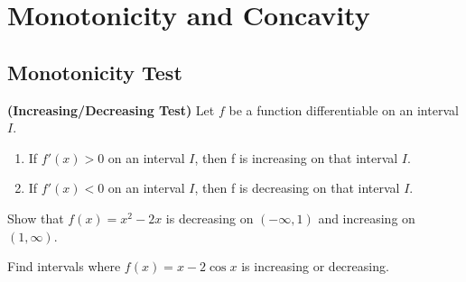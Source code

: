 
\hypertarget{monotonicity-and-concavity}{%
\section{Monotonicity and Concavity}\label{monotonicity-and-concavity}}

\hypertarget{monotonicity-test}{%
\subsection{Monotonicity Test}\label{monotonicity-test}}

\begin{proposition}

\textbf{(Increasing/Decreasing Test)} Let \(f\) be a function
differentiable on an interval \(I\).

\begin{enumerate}[sepno]
\item
  If \(f'(x)>0\) on an interval \(I\), then f is increasing on that
  interval \(I\).
\item
  If \(f'(x)<0\) on an interval \(I\), then f is decreasing on that
  interval \(I\).
\end{enumerate}

\end{proposition}

\begin{example}

Show that \(f(x)=x^2-2x\) is decreasing on \((-\infty, 1)\) and
increasing on \((1,\infty)\).

\end{example}
\vspace*{6\baselineskip}

\begin{example}

Find intervals where \(f(x)=x-2\cos x\) is increasing or decreasing.

\end{example}
\vspace*{6\baselineskip}


